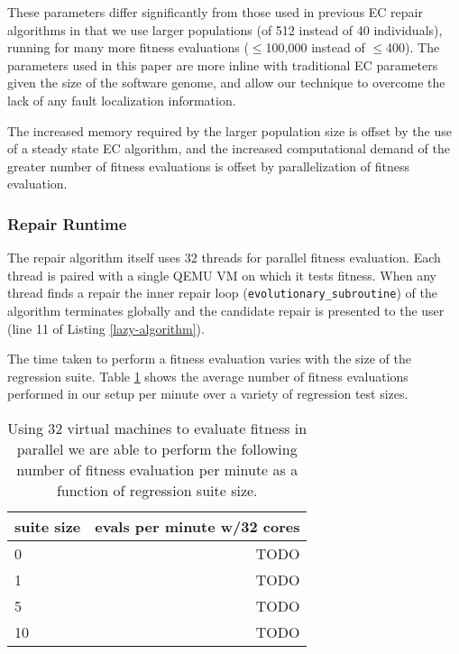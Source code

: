 \documentclass{sigcomm-alternate}
\begin{document}
These parameters differ significantly from those used in previous EC
repair algorithms \cite{forrest2009genetic,legoues2011systematicstudy,le2012representations} in that we
use larger populations (of 512 instead of 40 individuals), running for
many more fitness evaluations ($\leq$100,000 instead of $\leq$400).  The
parameters used in this paper are more inline with traditional EC
parameters given the size of the software genome, and allow our
technique to overcome the lack of any fault localization information.

The increased memory required by the larger population size is offset
by the use of a steady state EC algorithm, and the increased
computational demand of the greater number of fitness evaluations is
offset by parallelization of fitness evaluation.
\subsubsection{Repair Runtime}
\label{sec-4-1-2}
The repair algorithm itself uses 32 threads for parallel fitness
evaluation.  Each thread is paired with a single QEMU VM on which it
tests fitness.  When any thread finds a repair the inner repair loop
(\texttt{evolutionary\_subroutine}) of the algorithm terminates globally and
the candidate repair is presented to the user (line 11 of Listing
\ref{lazy-algorithm}).

The time taken to perform a fitness evaluation varies with the size of
the regression suite.  Table \ref{test-speed} shows the average number of
fitness evaluations performed in our setup per minute over a variety
of regression test sizes.

\begin{table}[htb]
\centering
\begin{tabular}{l|r}
suite size & evals per minute w/32 cores \\
\hline
0          & TODO                        \\
1          & TODO                        \\
5          & TODO                        \\
10         & TODO                        \\
\end{tabular}\caption{\label{test-speed}Using 32 virtual machines to evaluate fitness in parallel we are able to perform the following number of fitness evaluation per minute as a function of regression suite size.}
\end{table}
\end{document}
